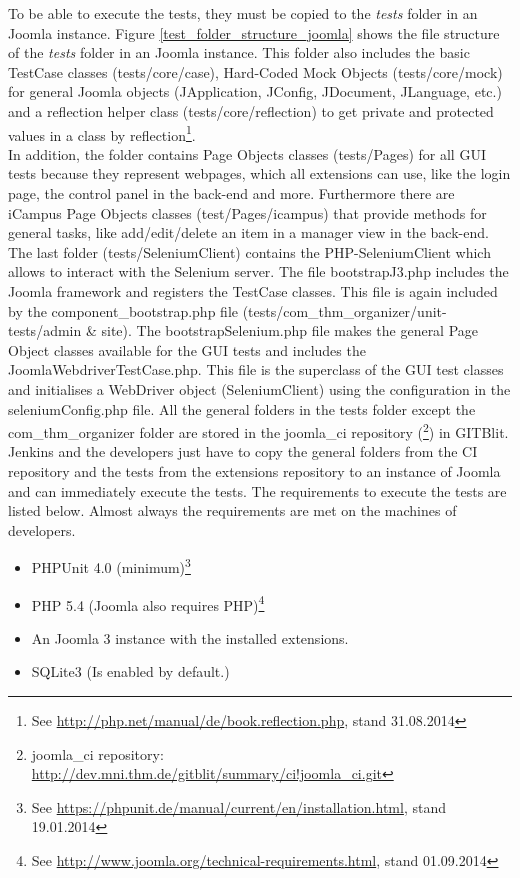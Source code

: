 To be able to execute the tests, they must be copied to the \textit{tests} folder in an Joomla instance. Figure \ref{test_folder_structure_joomla} shows the file structure of the \textit{tests} folder in an Joomla instance. This folder also includes the basic TestCase classes (tests/core/case), Hard-Coded Mock Objects (tests/core/mock) for general Joomla objects (JApplication, JConfig, JDocument, JLanguage, etc.) and a reflection helper class (tests/core/reflection) to get private and protected values in a class by reflection\footnote{See \url{http://php.net/manual/de/book.reflection.php}, stand 31.08.2014}. \\ 
In addition, the folder contains Page Objects classes (tests/Pages) for all GUI tests because they represent webpages, which all extensions can use, like the login page, the control panel in the back-end and more. Furthermore there are iCampus Page Objects classes (test/Pages/icampus) that provide methods for general tasks, like add/edit/delete an item in a manager view in the back-end. The last folder (tests/SeleniumClient) contains the PHP-SeleniumClient which allows to interact with the Selenium server. The file bootstrapJ3.php includes the Joomla framework and registers the TestCase classes. This file is again included by the component\_bootstrap.php file (tests/com\_thm\_organizer/unit-tests/admin \& site). The bootstrapSelenium.php file makes the general Page Object classes available for the GUI tests and includes the JoomlaWebdriverTestCase.php. This file is the superclass of the GUI test classes and initialises a WebDriver object (SeleniumClient) using the configuration in the seleniumConfig.php file. All the general folders in the tests folder except the com\_thm\_organizer folder are stored in the joomla\_ci repository (\footnote{joomla\_ci repository: \url{http://dev.mni.thm.de/gitblit/summary/ci!joomla_ci.git}}) in GITBlit. Jenkins and the developers just have to copy the general folders from the CI repository and the tests from the extensions repository to an instance of Joomla and can immediately execute the tests. The requirements to execute the tests are listed below. Almost always the requirements are met on the machines of developers. 
\begin{itemize}
\item PHPUnit 4.0 (minimum)\footnote{See \url{https://phpunit.de/manual/current/en/installation.html}, stand 19.01.2014}
\item PHP 5.4 (Joomla also requires PHP)\footnote{See \url{http://www.joomla.org/technical-requirements.html}, stand 01.09.2014}
\item An Joomla 3 instance with the installed extensions.
\item SQLite3 (Is enabled by default.)
\end{itemize}
	
